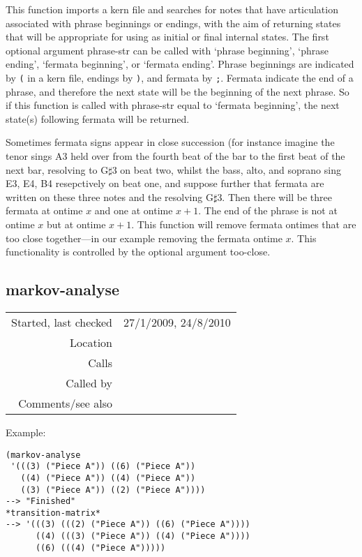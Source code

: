 \noindent This function imports a kern file and searches
for notes that have articulation associated with phrase
beginnings or endings, with the aim of returning states
that will be appropriate for using as initial or final
internal states. The first optional argument phrase-str
can be called with `phrase beginning', `phrase ending',
`fermata beginning', or `fermata ending'. Phrase
beginnings are indicated by \texttt{(} in a kern file,
endings by \texttt{)}, and fermata by \texttt{;}.
Fermata indicate the end of a phrase, and therefore the
next state will be the beginning of the next phrase. So
if this function is called with phrase-str equal to
`fermata beginning', the next state(s) following fermata
will be returned.

Sometimes fermata signs appear in close succession (for
instance imagine the tenor sings A3 held over from the
fourth beat of the bar to the first beat of the next
bar, resolving to G$\sharp$3 on beat two, whilst the
bass, alto, and soprano sing E3, E4, B4 resepctively on
beat one, and suppose further that fermata are written
on these three notes and the resolving G$\sharp$3. Then
there will be three fermata at ontime $x$ and one at
ontime $x + 1$. The end of the phrase is not at ontime
$x$ but at ontime $x + 1$. This function will remove
fermata ontimes that are too close together---in our
example removing the fermata ontime $x$. This
functionality is controlled by the optional argument
too-close.


\subsection*{markov-analyse}\label{fun:markov-analyse}

\vspace{0.3cm}
\begin{tabular}{r|p{8cm}}
Started, last checked & 27/1/2009, 24/8/2010 \\
Location & \nameref{sec:markov-analyse} \\
Calls & \nameref{fun:update-stm} \\
Called by & \nameref{fun:construct-stm} \\
Comments/see also & \nameref{fun:markov-analyse<-}
\end{tabular}

\vspace{0.5cm}
\noindent Example:
\begin{verbatim}
(markov-analyse
 '(((3) ("Piece A")) ((6) ("Piece A"))
   ((4) ("Piece A")) ((4) ("Piece A"))
   ((3) ("Piece A")) ((2) ("Piece A"))))
--> "Finished"
*transition-matrix*
--> '(((3) (((2) ("Piece A")) ((6) ("Piece A"))))
      ((4) (((3) ("Piece A")) ((4) ("Piece A"))))
      ((6) (((4) ("Piece A")))))
\end{verbatim}

